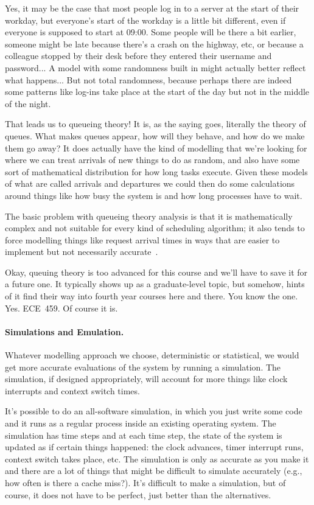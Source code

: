 Yes, it may be the case that most people log in to a server at the start of their workday, but everyone's start of the workday is a little bit different, even if everyone is supposed to start at 09:00. Some people will be there a bit earlier, someone might be late because there's a crash on the highway, etc, or because a colleague stopped by their desk before they entered their username and password...  A model with some randomness built in might actually better reflect what happens... But not total randomness, because perhaps there are indeed some patterns like log-ins take place at the start of the day but not in the middle of the night.

That leads us to queueing theory! It is, as the saying goes, literally the theory of queues. What makes queues appear, how will they behave, and how do we make them go away? It does actually have the kind of modelling that we're looking for where we can treat arrivals of new things to do as random, and also have some sort of mathematical distribution for how long tasks execute. Given these models of what are called arrivals and departures we could then do some calculations around things like how busy the system is and how long processes have to wait.

The basic problem with queueing theory analysis is that it is mathematically complex and not suitable for every kind of scheduling algorithm; it also tends to force modelling things like request arrival times in ways that are easier to implement but not necessarily accurate~\cite{osc}.

Okay, queuing theory is too advanced for this course and we'll have to save it for a future one. It typically shows up as a graduate-level topic, but somehow, hints of it find their way into fourth year courses here and there. You know the one. Yes. ECE~459. Of course it is. 

\paragraph{Simulations and Emulation.}
Whatever modelling approach we choose, deterministic or statistical, we would get more accurate evaluations of the system by running a simulation. The simulation, if designed appropriately, will account for more things like clock interrupts and context switch times.

It's possible to do an all-software simulation, in which you just write some code and it runs as a regular process inside an existing operating system. The simulation has time steps and at each time step, the state of the system is updated as if certain things happened: the clock advances, timer interrupt runs, context switch takes place, etc. The simulation is only as accurate as you make it and there are a lot of things that might be difficult to simulate accurately (e.g., how often is there a cache miss?). It's difficult to make a simulation, but of course, it does not have to be perfect, just better than the alternatives.

